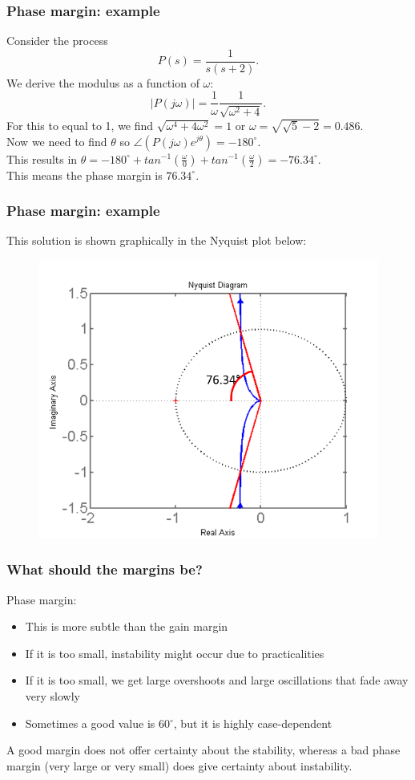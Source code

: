\begin{frame}
	\frametitle{Phase margin: example}
	Consider the process \vspace{-2ex} $$P(s)=\frac{1}{s(s+2)}.$$
	We derive the modulus as a function of $\omega$: $$\big|P(j\omega)\big|=\frac{1}{\omega}\frac{1}{\sqrt{\omega^2+4}}.$$
	For this to equal to 1, we find $\sqrt{\omega^4+4\omega^2}=1$ or $\omega=\sqrt{\sqrt{5}-2}=0.486$.\\
	Now we need to find $\theta$ so $\angle(P(j\omega)e^{j\theta})=-180^{\circ}$.\\
	This results in $\theta = -180^{\circ}+tan^{-1}(\frac{\omega}{0})+tan^{-1}(\frac{\omega}{2})=-76.34^{\circ}$. \\
	This means the phase margin is $76.34^{\circ}$.
\end{frame}

\begin{frame}
	\frametitle{Phase margin: example}
	This solution is shown graphically in the Nyquist plot below:
	\begin{figure}
		\includegraphics[width=0.65\linewidth]{phase_example}
	\end{figure}
\end{frame}

\begin{frame}
	\frametitle{What should the margins be?}
	\vspace{-4ex}
	Phase margin:
	\begin{itemize}
		\item This is more subtle than the gain margin
		\item If it is too small, instability might occur due to practicalities
		\item If it is too small, we get large overshoots and large oscillations that fade away very slowly
		\item Sometimes a good value is 60$^{\circ}$, but it is highly case-dependent
	\end{itemize}
	\bigskip
	A good margin does not offer certainty about the stability, whereas a bad phase margin (very large or very small) does give certainty about instability.
\end{frame}

